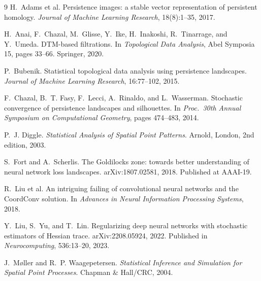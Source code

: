 \documentclass[11pt,a4paper]{article}
\begin{document}
{\footnotesize
\setlength{\bibsep}{1pt plus 0.3ex}
\begin{thebibliography}{9}
\setlength{\itemsep}{0pt}
\setlength{\parskip}{0pt}
H.~Adams et al.
\newblock Persistence images: a stable vector representation of persistent
homology.
\newblock \emph{Journal of Machine Learning Research}, 18(8):1--35, 2017.

H.~Anai, F.~Chazal, M.~Glisse, Y.~Ike, H.~Inakoshi, R.~Tinarrage, and
Y.~Umeda.
\newblock DTM-based filtrations.
\newblock In \emph{Topological Data Analysis}, Abel Symposia 15, pages 33--66.
Springer, 2020.

P.~Bubenik.
\newblock Statistical topological data analysis using persistence landscapes.
\newblock \emph{Journal of Machine Learning Research}, 16:77--102, 2015.

F.~Chazal, B.~T. Fasy, F.~Lecci, A.~Rinaldo, and L.~Wasserman.
\newblock Stochastic convergence of persistence landscapes and silhouettes.
\newblock In \emph{Proc.\ 30th Annual Symposium on Computational Geometry},
pages 474--483, 2014.

P.~J. Diggle.
\newblock \emph{Statistical Analysis of Spatial Point Patterns}.
\newblock Arnold, London, 2nd edition, 2003.

S.~Fort and A.~Scherlis.
\newblock The Goldilocks zone: towards better understanding of neural network
loss landscapes.
\newblock arXiv:1807.02581, 2018. Published at AAAI-19.

R.~Liu et al.
\newblock An intriguing failing of convolutional neural networks and the
CoordConv solution.
\newblock In \emph{Advances in Neural Information Processing Systems}, 2018.

Y.~Liu, S.~Yu, and T.~Lin.
\newblock Regularizing deep neural networks with stochastic estimators of
Hessian trace.
\newblock arXiv:2208.05924, 2022. Published in \emph{Neurocomputing},
536:13--20, 2023.

J.~M\o ller and R.~P. Waagepetersen.
\newblock \emph{Statistical Inference and Simulation for Spatial Point
Processes}.
\newblock Chapman \& Hall/CRC, 2004.


\end{thebibliography}}
\end{document}
